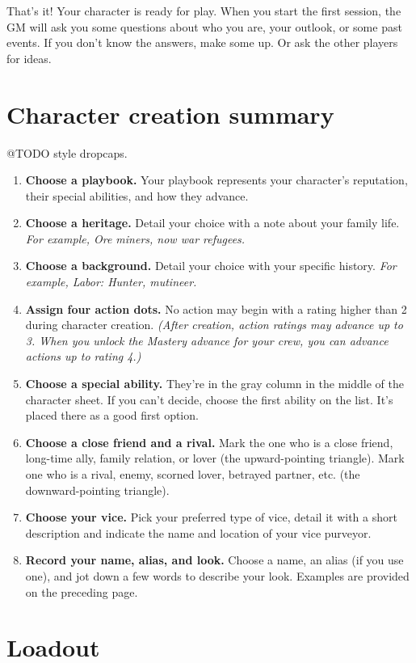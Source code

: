 \documentclass[11pt,fleqn,a5paper]{book}
\begin{document}
That’s it! Your character is ready for play. When you start the first session, the GM will ask you some questions about who you are, your outlook, or some past events. If you don’t know the answers, make some up. Or ask the other players for ideas.

\section{Character creation summary}

@TODO style dropcaps.

\begin{enumerate}
	\item \textbf{Choose a playbook.} Your playbook represents your character’s reputation, their special abilities, and how they advance.
	\item \textbf{Choose a heritage.} Detail your choice with a note about your family life. \emph{For example, Ore miners, now war refugees.}
	\item \textbf{Choose a background.} Detail your choice with your specific history. \emph{For example, Labor: Hunter, mutineer.}
	\item \textbf{Assign four action dots.} No action may begin with a rating higher than 2 during character creation. \emph{(After creation, action ratings may advance up to 3. When you unlock the Mastery advance for your crew, you can advance actions up to rating 4.)}
	\item \textbf{Choose a special ability.} They’re in the gray column in the middle of the character sheet. If you can’t decide, choose the first ability on the list. It’s placed there as a good first option.
	\item \textbf{Choose a close friend and a rival.} Mark the one who is a close friend, long-time ally, family relation, or lover (the upward-pointing triangle). Mark one who is a rival, enemy, scorned lover, betrayed partner, etc. (the downward-pointing triangle).
	\item \textbf{Choose your vice.} Pick your preferred type of vice, detail it with a short description and indicate the name and location of your vice purveyor.
	\item \textbf{Record your name, alias, and look.} Choose a name, an alias (if you use one), and jot down a few words to describe your look. Examples are provided on the preceding page.
\end{enumerate}

\section{Loadout}
\end{document}
